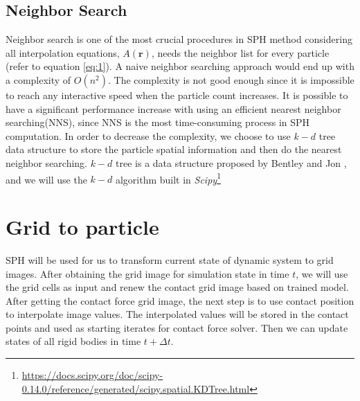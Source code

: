     \subsection{Neighbor Search}
    Neighbor search is one of the most crucial procedures in SPH method considering all interpolation equations, $A(\textbf{r})$, needs the neighbor list for every particle (refer to equation \ref{eq:1}). A naive neighbor searching approach would end up with a complexity of $O(n^2)$. The complexity is not good enough since it is impossible to reach any interactive speed when the particle count increases. It is possible to have a significant performance increase with using an efficient nearest neighbor searching(NNS), since NNS is the most time-consuming process in SPH computation. In order to decrease the complexity, we choose to use $k-d$ tree data structure to store the particle spatial information and then do the nearest neighbor searching. $k-d$ tree is a data structure proposed by Bentley and Jon \cite{bentley1975multidimensional}, and we will use the $k-d$ algorithm built in \textit{Scipy}\footnote{\url{https://docs.scipy.org/doc/scipy-0.14.0/reference/generated/scipy.spatial.KDTree.html}}


\section{Grid to particle}
    SPH will be used for us to transform current state of dynamic system to grid images. After obtaining the grid image for simulation state in time $t$, we will use the grid cells as input and renew the contact grid image based on trained model. After getting the contact force grid image, the next step is to use contact position to interpolate image values. The interpolated values will be stored in the contact points and used as starting iterates for contact force solver. Then we can update states of all rigid bodies in time $t+\Delta{t}$.

